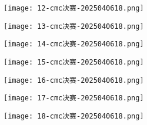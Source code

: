 \begin{figure}[H]
\centering
\texttt{[image: 12-cmc决赛-2025040618.png]}
\label{}
\end{figure}
\begin{figure}[H]
\centering
\texttt{[image: 13-cmc决赛-2025040618.png]}
\label{}
\end{figure}
\begin{figure}[H]
\centering
\texttt{[image: 14-cmc决赛-2025040618.png]}
\label{}
\end{figure}
\begin{figure}[H]
\centering
\texttt{[image: 15-cmc决赛-2025040618.png]}
\label{}
\end{figure}

\begin{figure}[H]
\centering
\texttt{[image: 16-cmc决赛-2025040618.png]}
\label{}
\end{figure}
\begin{figure}[H]
\centering
\texttt{[image: 17-cmc决赛-2025040618.png]}
\label{}
\end{figure}
\begin{figure}[H]
\centering
\texttt{[image: 18-cmc决赛-2025040618.png]}
\label{}
\end{figure}
